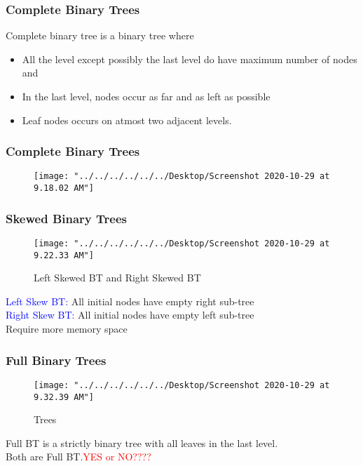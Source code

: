 \documentclass[11pt]{beamer}
\begin{document}
    \begin{frame}	
    	\frametitle{Complete Binary Trees}
    	\begin{block}{Complete binary tree}
    	  is a binary tree where
    	  \begin{itemize}
    	  	\item All the level except possibly the last level do have maximum number of nodes and
    	  	\item In the last level, nodes occur as far and as left as possible
    	  	\item Leaf nodes occurs on atmost two adjacent levels.
    	  \end{itemize}	
    	\end{block}
    \end{frame}
    
     \begin{frame}	
    	\frametitle{Complete Binary Trees}
         \begin{figure}
         	\centering
         	\texttt{[image: "../../../../../../Desktop/Screenshot 2020-10-29 at 9.18.02 AM"]}
         	\caption{}
         	\label{fig:screenshot-2020-10-29-at-9}
         \end{figure}
    \end{frame}

     \begin{frame}	
    	\frametitle{Skewed Binary Trees}
        \begin{figure}
        	\centering
        	\texttt{[image: "../../../../../../Desktop/Screenshot 2020-10-29 at 9.22.33 AM"]}
        	\caption{Left Skewed BT	and Right Skewed BT}
        	\label{fig:screenshot-2020-10-29-at-9}
        \end{figure}  
       
       \textcolor{blue}{Left Skew BT:}	All initial nodes have empty right sub-tree
\\
       \textcolor{blue}{Right Skew BT:}	All initial nodes have empty left sub-tree
      \\ Require more memory space
    \end{frame}
   
    \begin{frame}	
   	\frametitle{Full  Binary Trees}
    \begin{figure}
    	\centering
    	\texttt{[image: "../../../../../../Desktop/Screenshot 2020-10-29 at 9.32.39 AM"]}
    	\caption{Trees}
    	\label{fig:screenshot-2020-10-29-at-9}
    \end{figure}
     Full BT is a strictly binary tree with all leaves in the last level.\\
     Both are Full BT.\textcolor{red}{YES	or NO????
}
     
   \end{frame}
    
\end{document}

